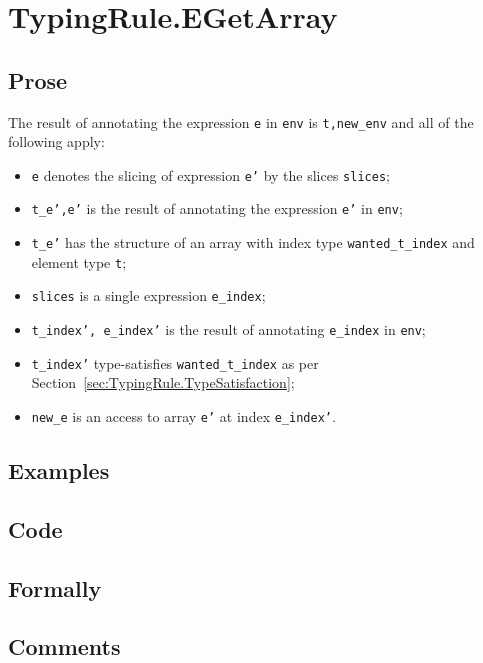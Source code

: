 \documentclass{book}
\begin{document}
\section{TypingRule.EGetArray \label{sec:TypingRule.EGetArray}}

  \subsection{Prose}
  The result of annotating the expression \texttt{e} in \texttt{env} is
\texttt{t,new\_env} and all of the following apply:
  \begin{itemize}
  \item \texttt{e} denotes the slicing of expression \texttt{e'} by the slices \texttt{slices};
  \item \texttt{t\_e',e'} is the result of annotating the expression \texttt{e'} in \texttt{env};
  \item \texttt{t\_e'} has the structure of an array with index type \texttt{wanted\_t\_index} and element type \texttt{t};
  \item \texttt{slices} is a single expression \texttt{e\_index};
  \item \texttt{t\_index', e\_index'} is the result of annotating \texttt{e\_index} in \texttt{env};
  \item \texttt{t\_index'} type-satisfies \texttt{wanted\_t\_index} as per Section~\ref{sec:TypingRule.TypeSatisfaction};
  \item \texttt{new\_e} is an access to array \texttt{e'} at index \texttt{e\_index'}.
  \end{itemize}

  \subsection{Examples}

  \subsection{Code}

  \subsection{Formally}

  \subsection{Comments}
\end{document}
